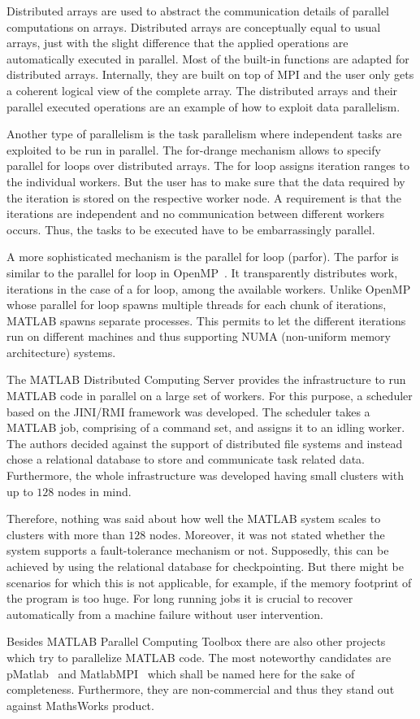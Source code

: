 Distributed arrays are used to abstract the communication details of parallel computations on arrays.
Distributed arrays are conceptually equal to usual arrays, just with the slight difference that the applied operations are automatically executed in parallel.
Most of the built-in functions are adapted for distributed arrays.
Internally, they are built on top of MPI and the user only gets a coherent logical view of the complete array.
The distributed arrays and their parallel executed operations are an example of how to exploit data parallelism.

Another type of parallelism is the task parallelism where independent tasks are exploited to be run in parallel.
The for-drange mechanism allows to specify parallel for loops over distributed arrays.
The for loop assigns iteration ranges to the individual workers.
But the user has to make sure that the data required by the iteration is stored on the respective worker node.
A requirement is that the iterations are independent and no communication between different workers occurs.
Thus, the tasks to be executed have to be embarrassingly parallel.

A more sophisticated mechanism is the parallel for loop (parfor).
The parfor is similar to the parallel for loop in OpenMP~\cite{dagum:csei1998a}.
It transparently distributes work, iterations in the case of a for loop, among the available workers.
Unlike OpenMP whose parallel for loop spawns multiple threads for each chunk of iterations, MATLAB spawns separate processes.
This permits to let the different iterations run on different machines and thus supporting NUMA (non-uniform memory architecture) systems.

The MATLAB Distributed Computing Server provides the infrastructure to run MATLAB code in parallel on a large set of workers.
For this purpose, a scheduler based on the JINI/RMI framework was developed.
The scheduler takes a MATLAB job, comprising of a command set, and assigns it to an idling worker.
The authors decided against the support of distributed file systems and instead chose a relational database to store and communicate task related data.
Furthermore, the whole infrastructure was developed having small clusters with up to $128$ nodes in mind.

Therefore, nothing was said about how well the MATLAB system scales to clusters with more than $128$ nodes.
Moreover, it was not stated whether the system supports a fault-tolerance mechanism or not.
Supposedly, this can be achieved by using the relational database for checkpointing.
But there might be scenarios for which this is not applicable, for example, if the memory footprint of the program is too huge.
For long running jobs it is crucial to recover automatically from a machine failure without user intervention.

Besides MATLAB Parallel Computing Toolbox there are also other projects which try to parallelize MATLAB code.
The most noteworthy candidates are pMatlab~\cite{bliss:ijhpca2007a} and MatlabMPI~\cite{kepner:jpdc2004a} which shall be named here for the sake of completeness.
Furthermore, they are non-commercial and thus they stand out against MathsWorks product.
